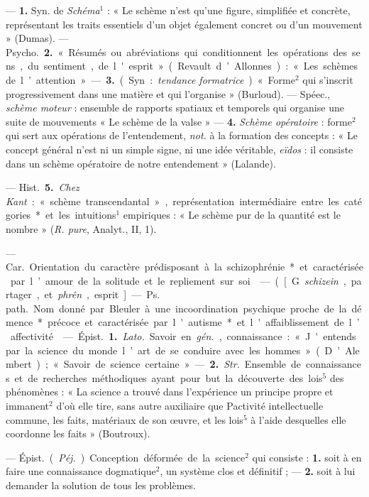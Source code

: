 \begin{itemize}[leftmargin=1cm, label=, itemsep=1pt]
 — {\bf 1.} Syn. de {\it Schéma}$^1$ : « Le schème n’est qu’une
figure, simplifiée et concrète, représentant les traits essentiels d’un objet
également concret ou d’un mouvement » (Dumas). — \si{Psycho.} {\bf 2.}
« Résumés ou abréviations qui conditionnent les opérations des sens, du
sentiment, de l'esprit » (Revault d’Allonnes) : « Les schèmes de
l’attention ». — {\bf 3.} (Syn. : {\it tendance formatrice}). « Forme$^2$
qui s’inscrit progressivement dans une matière et qui l’organise »
(Burloud). — Spéec., {\it schème moteur} : ensemble de rapports spatiaux et
temporels qui organise une suite de mouvements « Le schème de la valse » —
{\bf 4.} {\it Schème opératoire} : forme$^2$ qui sert aux opérations de
l’entendement, {\it not.} à la formation des concepts : « Le concept général
n’est ni un simple signe, ni une idée véritable,
{\it eïdos} : il consiste dans un schème opératoire de notre
entendement » (Lalande).

— \si{Hist.} {\bf 5.} {\it Chez Kant} : « schème transcendantal »,
représentation intermédiaire entre les catégories* et les intuitions$^1$
empiriques : « Le schème pur de la quantité est le nombre » ({\it R. pure},
Analyt., II, 1).

 — \si{Car.} Orientation du caractère prédisposant à la schizophrénie* et caractérisée par l’amour de la solitude et le repliement sur soi.

 — ([G. {\it schizein}, partager, et {\it phrên},
esprit] — \si{Ps. path.} Nom donné par Bleuler à une incoordination
psychique proche de la démence* précoce et caractérisée par l'autisme* et
l'affaiblissement de l’affectivité.

 — \si{Épist.} {\bf 1.} {\it Lato.} Savoir en {\it gén.},
connaissance : « J'entends par la science du monde l’art de se conduire avec
les hommes » (D’Alembert) ; « Savoir de science certaine... ». — {\bf 2.}
{\it Str.} Ensemble de connaissances et de recherches méthodiques ayant pour
but la découverte des lois$^5$ des phénomènes : « La science a trouvé dans
l’expérience un principe propre et immanent$^2$ d’où elle tire, sans autre
auxiliaire que Pactivité intellectuelle commune, les faits, matériaux de son
œuvre, et les lois$^5$ à l'aide desquelles elle coordonne les
faits » (Boutroux).

 — \si{Épist.} ({\it Péj.}) Conception déformée de la
science$^2$ qui consiste : {\bf 1.} soit à en faire une connaissance
dogmatique$^2$, un système clos et définitif ; — {\bf 2.} soit à lui
demander la solution de tous les problèmes.


\end{itemize}
